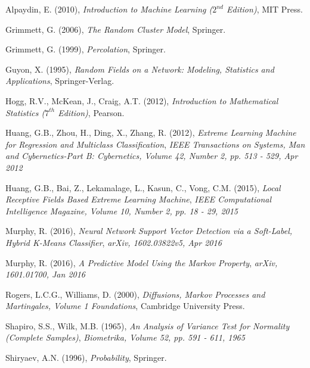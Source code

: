 \documentclass[11pt]{imsart}
\begin{document}
\begin{thebibliography}{99}

Alpaydin, E. (2010),
{\it Introduction to Machine Learning ($2^{nd}$ Edition)},
MIT Press.

Grimmett, G. (2006),
{\it The Random Cluster Model},
Springer.

Grimmett, G. (1999),
{\it Percolation},
Springer.

Guyon, X. (1995),
{\it Random Fields on a Network: Modeling, Statistics and Applications},
Springer-Verlag.

Hogg, R.V., McKean, J., Craig, A.T. (2012),
{\it Introduction to Mathematical Statistics ($7^{th}$ Edition)},
Pearson.

Huang, G.B., Zhou, H., Ding, X., Zhang, R. (2012),
{\it Extreme Learning Machine for Regression and Multiclass Classification},
{\it IEEE Transactions on Systems, Man and Cybernetics-Part B: Cybernetics, Volume 42, Number 2, pp. 513 - 529, Apr 2012}

Huang, G.B., Bai, Z., Lekamalage, L., Kasun, C., Vong, C.M. (2015),
{\it Local Receptive Fields Based Extreme Learning Machine},
{\it IEEE Computational Intelligence Magazine, Volume 10, Number 2, pp. 18 - 29, 2015}

Murphy, R. (2016),
{\it Neural Network Support Vector Detection via a Soft-Label, Hybrid K-Means Classifier},
{\it arXiv, 1602.03822v5, Apr 2016}

Murphy, R. (2016),
{\it A Predictive Model Using the Markov Property},
{\it arXiv, 1601.01700, Jan 2016}

Rogers, L.C.G., Williams, D. (2000),
{\it Diffusions, Markov Processes and Martingales, Volume 1 Foundations},
Cambridge University Press.

Shapiro, S.S., Wilk, M.B. (1965),
{\it An Analysis of Variance Test for Normality (Complete Samples)},
{\it Biometrika, Volume 52, pp. 591 - 611, 1965}

Shiryaev, A.N. (1996),
{\it Probability},
Springer.

\end{thebibliography}
\end{document}
